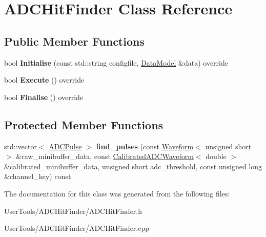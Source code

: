 \hypertarget{classADCHitFinder}{
\section{ADCHitFinder Class Reference}
\label{classADCHitFinder}
}
\subsection*{Public Member Functions}
\begin{DoxyCompactItemize}
\item 
\hypertarget{classADCHitFinder_a944ec97d4451bd6da825a51ddd2481a4}{
bool {\bfseries Initialise} (const std::string configfile, \hyperlink{classDataModel}{DataModel} \&data) override}
\label{classADCHitFinder_a944ec97d4451bd6da825a51ddd2481a4}

\item 
\hypertarget{classADCHitFinder_a17e0a0b2622a32902025ec1e2a498a42}{
bool {\bfseries Execute} () override}
\label{classADCHitFinder_a17e0a0b2622a32902025ec1e2a498a42}

\item 
\hypertarget{classADCHitFinder_a7bc2963aac26cf6dbb5e2be2ed034f60}{
bool {\bfseries Finalise} () override}
\label{classADCHitFinder_a7bc2963aac26cf6dbb5e2be2ed034f60}

\end{DoxyCompactItemize}
\subsection*{Protected Member Functions}
\begin{DoxyCompactItemize}
\item 
\hypertarget{classADCHitFinder_a1543f5cfc28798facf7dc1bd67697171}{
std::vector$<$ \hyperlink{classADCPulse}{ADCPulse} $>$ {\bfseries find\_\-pulses} (const \hyperlink{classWaveform}{Waveform}$<$ unsigned short $>$ \&raw\_\-minibuffer\_\-data, const \hyperlink{classCalibratedADCWaveform}{CalibratedADCWaveform}$<$ double $>$ \&calibrated\_\-minibuffer\_\-data, unsigned short adc\_\-threshold, const unsigned long \&channel\_\-key) const }
\label{classADCHitFinder_a1543f5cfc28798facf7dc1bd67697171}

\end{DoxyCompactItemize}


The documentation for this class was generated from the following files:\begin{DoxyCompactItemize}
\item 
UserTools/ADCHitFinder/ADCHitFinder.h\item 
UserTools/ADCHitFinder/ADCHitFinder.cpp\end{DoxyCompactItemize}
